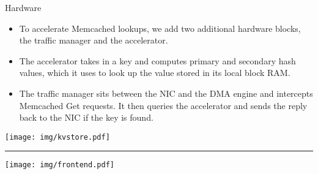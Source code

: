 \begin{block}{Hardware}

\begin{multicols}{2}
\begin{itemize}
\footnotesize
    \item To accelerate Memcached lookups, we add two additional hardware
        blocks, the traffic manager and the accelerator.
    \item The accelerator takes in a key and computes primary and secondary
        hash values, which it uses to look up the value stored in its local
        block RAM.

    \item The traffic manager sits between the NIC and the DMA engine and
        intercepts Memcached Get requests. It then queries the accelerator
        and sends the reply back to the NIC if the key is found.
\end{itemize}

\columnbreak
\begin{center}
    \texttt{[image: img/kvstore.pdf]}
\end{center}
\hrule
\begin{center}
    \texttt{[image: img/frontend.pdf]}
\end{center}

\end{multicols}

\end{block}
